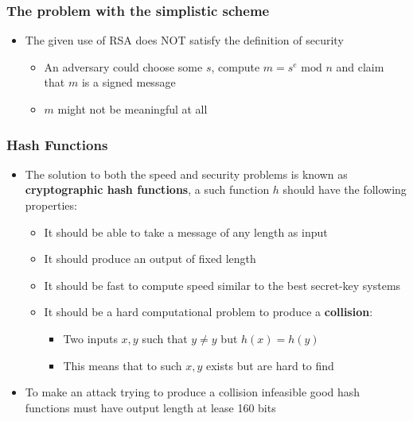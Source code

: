 \documentclass[11pt]{article}
\begin{document}
\subsubsection{The problem with the simplistic scheme}
\label{sec:org2d5ba88}
\begin{itemize}
\item The given use of RSA does NOT satisfy the definition of security
\begin{itemize}
\item An adversary could choose some \(s\), compute \(m = s^e \text{ mod } n\) and claim that \(m\) is a signed message
\item \(m\) might not be meaningful at all
\end{itemize}
\end{itemize}

\subsubsection{Hash Functions}
\label{sec:org00647a5}
\begin{itemize}
\item The solution to both the speed and security problems is known as \textbf{cryptographic hash functions}, a such function \(h\) should have the following properties:
\begin{itemize}
\item It should be able to take a message of any length as input
\item It should produce an output of fixed length
\item It should be fast to compute speed similar to the best secret-key systems
\item It should be a hard computational problem to produce a \textbf{collision}:
\begin{itemize}
\item Two inputs \(x,y\) such that \(y \neq y\) but \(h(x)=h(y)\)
\item This means that to such \(x,y\) exists but are hard to find
\end{itemize}
\end{itemize}

\item To make an attack trying to produce a collision infeasible good hash functions must have output length at lease 160 bits
\end{itemize}
\end{document}
